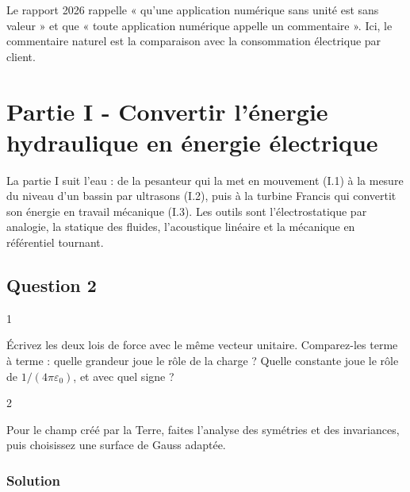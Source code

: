 \documentclass[11pt,a4paper]{article}
\begin{document}
\begin{jury}

Le rapport 2026 rappelle « qu'une application numérique sans unité est sans valeur » et que « toute application numérique appelle un commentaire ». Ici, le commentaire naturel est la comparaison avec la consommation électrique par client.

\end{jury}

\hypertarget{partie-i---convertir-luxe9nergie-hydraulique-en-uxe9nergie-uxe9lectrique}{%
\section{Partie I - Convertir l'énergie hydraulique en énergie électrique}\label{partie-i---convertir-luxe9nergie-hydraulique-en-uxe9nergie-uxe9lectrique}}

La partie I suit l'eau : de la pesanteur qui la met en mouvement (I.1) à la mesure du niveau d'un bassin par ultrasons (I.2), puis à la turbine Francis qui convertit son énergie en travail mécanique (I.3). Les outils sont l'électrostatique par analogie, la statique des fluides, l'acoustique linéaire et la mécanique en référentiel tournant.

\hypertarget{question-2}{%
\subsection{Question 2}\label{question-2}}

\begin{indication}{1}

Écrivez les deux lois de force avec le même vecteur unitaire. Comparez-les terme à terme : quelle grandeur joue le rôle de la charge ? Quelle constante joue le rôle de \(1/(4\pi\varepsilon_0)\), et avec quel signe ?

\end{indication}

\begin{indication}{2}

Pour le champ créé par la Terre, faites l'analyse des symétries et des invariances, puis choisissez une surface de Gauss adaptée.

\end{indication}

\hypertarget{solution-1}{%
\subsubsection{Solution}\label{solution-1}}
\end{document}
